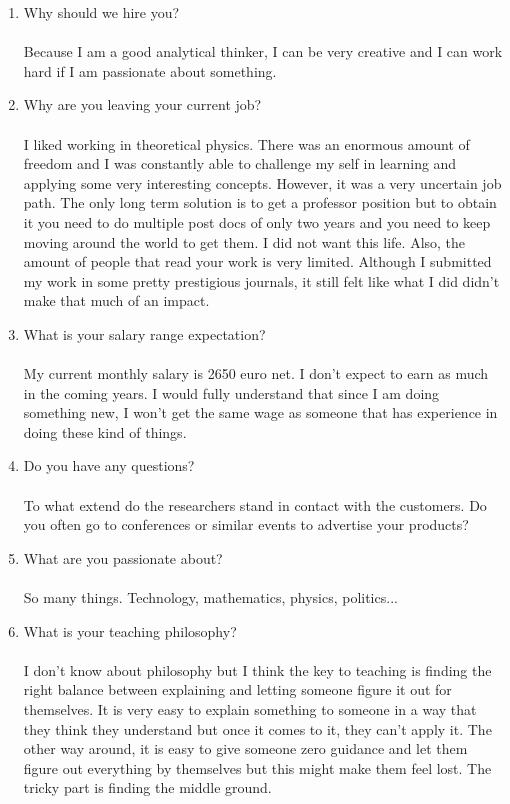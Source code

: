 \documentclass[12pt,a4paper,twoside]{article}
\begin{document}
\begin{enumerate}
		\item Why should we hire you?\\\\
		Because I am a good analytical thinker, I can be very creative and I can work hard if I am passionate about something.
		\item Why are you leaving your current job?\\\\
		I liked working in theoretical physics. There was an enormous amount of freedom and I was constantly able to challenge my self in learning and applying some very interesting concepts. However, it was a very uncertain job path. The only long term solution is to get a professor position but to obtain it you need to do multiple post docs of only two years and you need to keep moving around the world to get them. I did not want this life. Also, the amount of people that read your work is very limited. Although I submitted my work in some pretty prestigious journals, it still felt like what I did didn't make that much of an impact.
		\item What is your salary range expectation?\\\\
		My current monthly salary is 2650 euro net. I don't expect to earn as much in the coming years. I would fully understand that since I am doing something new, I won't get the same wage as someone that has experience in doing these kind of things.
		\item Do you have any questions?\\\\
		To what extend do the researchers stand in contact with the customers. Do you often go to conferences or similar events to advertise your products?
		\item What are you passionate about?\\\\
		So many things. Technology, mathematics, physics, politics...
		\item What is your teaching philosophy?\\\\
		I don't know about philosophy but I think the key to teaching is finding the right balance between explaining and letting someone figure it out for themselves. It is very easy to explain something to someone in a way that they think they understand but once it comes to it, they can't apply it. The other way around, it is easy to give someone zero guidance and let them figure out everything by themselves but this might make them feel lost. The tricky part is finding the middle ground.

\end{enumerate}
\end{document}

